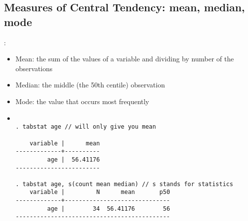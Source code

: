 \subsection{Measures of Central Tendency: mean, median, mode}
\begin{frame}[fragile]{{\secname: \\ \subsecname}}	
\begin{itemize}
	\item<1|handout:1-> Mean: the sum of the values of a variable and dividing
by number of the observations
	\item<2|handout:2->  Median: the middle (the 50th centile) observation
	\item<3|handout:3->  Mode: the value that occurs most frequently
	\item<4|handout:4>  []
\scriptsize
\begin{verbatim}

. tabstat age // will only give you mean

    variable |      mean
-------------+----------
         age |  56.41176
------------------------

. tabstat age, s(count mean median) // s stands for statistics
    variable |         N      mean       p50
-------------+------------------------------
         age |        34  56.41176        56
--------------------------------------------
	
\end{verbatim}

\end{itemize}
\end{frame}

